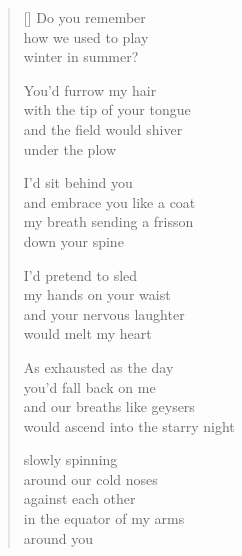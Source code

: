 \documentclass[12pt,a4paper]{article}
\begin{document}

\newpage

\poemtitle{}

\settowidth{\versewidth}{would ascend into the starry night}

\bigskip

\begin{verse}[\versewidth]
  Do you remember \\
  how we used to play \\
  winter in summer?

  You'd furrow my hair \\
  with the tip of your tongue \\
  and the field would shiver \\
  under the plow

  I'd sit behind you \\
  and embrace you like a coat \\
  my breath sending a frisson \\
  down your spine

  I'd pretend to sled \\
  my hands on your waist \\
  and your nervous laughter \\
  would melt my heart

  As exhausted as the day \\
  you'd fall back on me \\
  and our breaths like geysers \\
  would ascend into the starry night

  slowly spinning \\
  around our cold noses \\
  against each other \\
  in the equator of my arms \\
  around you
\end{verse}


\newpage

\poemtitle{}

\settowidth{\versewidth}{the infinite kaleidoscope}

\bigskip
\end{document}
